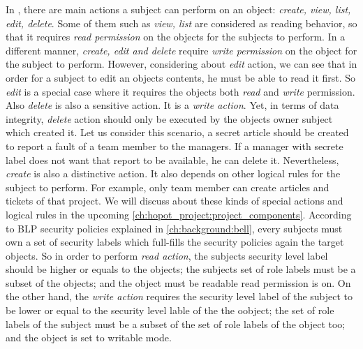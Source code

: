 In \myProject, there are main actions a subject can perform on an object: \emph{create, view, list, edit, delete}.
Some of them such as \emph{view, list} are considered as reading behavior, so that it requires \emph{read permission} on the objects for the subjects to perform.
In a different manner, \emph{create, edit and delete} require \emph{write permission} on the object for the subject to perform.
However, considering about \emph{edit} action, we can see that in order for a subject to edit an objects contents, he must be able to read it first.
So \emph{edit} is a special case where it requires the objects both \emph{read} and \emph{write} permission.
Also \emph{delete} is also a sensitive action.
It is a \emph{write action}.
Yet, in terms of data integrity, \emph{delete} action should only be executed by the objects owner \ie subject which created it.
Let us consider this scenario, a secret article should be created to report a fault of a team member to the managers.
If a manager with secrete label does not want that report to be available, he can delete it.
Nevertheless, \emph{create} is also a distinctive action.
It also depends on other logical rules for the subject to perform.
For example, only team member can create articles and tickets of that project.
We will discuss about these kinds of special actions and logical rules in the upcoming \autoref{ch:hopot_project:project_components}.
According to BLP security policies explained in \autoref{ch:background:bell}, every subjects must own a set of security labels which full-fills the security policies again the target objects.
So in order to perform \emph{read action}, the subjects security level label should be higher or equals to the objects;
the subjects set of role labels must be a subset of the objects;
and the object must be readable \ie read permission is on.
On the other hand, the \emph{write action} requires the security level label of the subject to be lower or equal to the security level lable of the the oobject;
the set of role labels of the subject must be a subset of the set of role labels of the object too;
and the object is set to writable mode.



